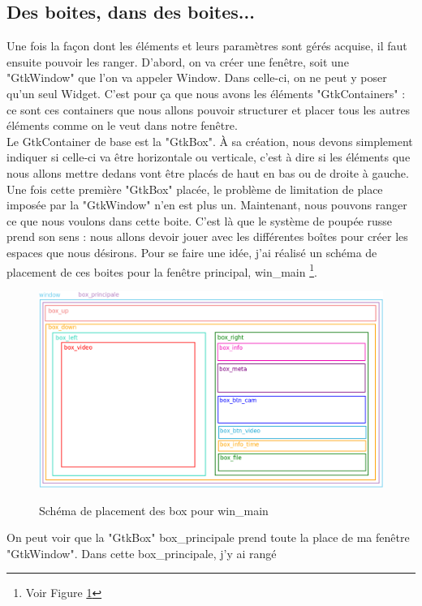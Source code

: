 \documentclass[11pt,french,a4paper]{report}
\begin{document}
        \subsection{Des boites, dans des boites...}
Une fois la façon dont les éléments et leurs paramètres sont gérés acquise, il faut ensuite pouvoir les ranger. 
D'abord, on va créer une fenêtre, soit une "GtkWindow" que l'on va appeler Window. Dans celle-ci, on ne peut y poser qu'un seul Widget. 
C'est pour ça que nous avons les éléments "GtkContainers" : ce sont ces containers que nous allons pouvoir structurer et placer tous 
les autres éléments comme on le veut dans notre fenêtre. \\
Le GtkContainer de base est la "GtkBox". À sa création, nous devons simplement indiquer si celle-ci va être horizontale ou verticale, 
c'est à dire si les éléments que nous allons mettre dedans vont être placés de haut en bas ou de droite à gauche. 
Une fois cette première "GtkBox" placée, le problème de limitation de place imposée par la "GtkWindow" n'en est plus un. 
Maintenant, nous pouvons ranger ce que nous voulons dans cette boite. C'est là que le système de poupée russe prend son sens : 
nous allons devoir jouer avec les différentes boîtes pour créer les espaces que nous désirons. 
Pour se faire une idée, j'ai réalisé un schéma de placement de ces boites pour la fenêtre principal, win\_main 
\footnote{Voir Figure \ref{sch_box_win_main}}.
\begin{figure}[!h]
    \centering
        \includegraphics[scale=0.5]{../images/dia/schema_bloc_mainwin.png} \\
        \caption{Schéma de placement des box pour win\_main}
        \label{sch_box_win_main}
\end{figure}
On peut voir que la "GtkBox" box\_principale prend toute la place de ma fenêtre "GtkWindow". Dans cette box\_principale, j'y ai rangé 
\end{document}
